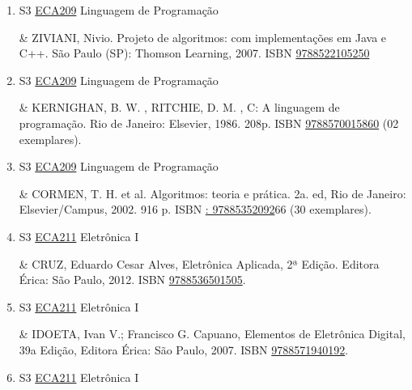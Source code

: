 \documentclass[12pt,a4paper]{book}
\begin{document}
\begin{enumerate}
& SOUZA, M.  A.  F. , GOMES, M.  M. , SOARES, M.  V. , CONCILIO, R. , Algoritmos e Lógica de Programação,Editora Cengage Learning, São Paulo, 2008.  (25 exemplares).
 \item S3 \hyperref[PUD:ECA209]{ECA209} Linguagem de Programação

& ZIVIANI, Nivio.  Projeto de algoritmos: com implementações em Java e C++.  São Paulo (SP): Thomson Learning, 2007.  ISBN \href{http://www.bn.br/site/pages/servicosProfissionais/agenciaISBN/isbnBusca/FbnBuscaISBNCatalogo.asp?pField=ISBN&pIntPagina=1&pISBN=22105250&nidbISBN=true&hidbISBN=true}{9788522105250}
 

 \item S3 \hyperref[PUD:ECA209]{ECA209} Linguagem de Programação

& KERNIGHAN, B.  W. , RITCHIE, D.  M. , C: A linguagem de programação.  Rio de Janeiro: Elsevier, 1986.  208p.  ISBN \href{http://www.bn.br/site/pages/servicosProfissionais/agenciaISBN/isbnBusca/FbnBuscaISBNCatalogo.asp?pField=ISBN&pIntPagina=1&pISBN=70015860&nidbISBN=true&hidbISBN=true}{9788570015860} (02 exemplares). 
 

 \item S3 \hyperref[PUD:ECA209]{ECA209} Linguagem de Programação

& CORMEN, T.  H.  et al.  Algoritmos: teoria e prática.  2a.  ed, Rio de Janeiro: Elsevier/Campus, 2002.  916 p.  ISBN \href{http://www.google.com/search?hl=pt-BR&tbo=p&tbm=bks&q=isbn:: 97885352092&num=10}{: 97885352092}66 (30 exemplares).
 \item S3 \hyperref[PUD:ECA211]{ECA211} Eletrônica I

& CRUZ, Eduardo Cesar Alves, Eletrônica Aplicada, 2ª Edição.  Editora Érica: São Paulo, 2012.  ISBN \href{http://www.bn.br/site/pages/servicosProfissionais/agenciaISBN/isbnBusca/FbnBuscaISBNCatalogo.asp?pField=ISBN&pIntPagina=1&pISBN=36501505&nidbISBN=true&hidbISBN=true}{9788536501505}. 
 

 \item S3 \hyperref[PUD:ECA211]{ECA211} Eletrônica I

& IDOETA, Ivan V.;  Francisco G.  Capuano, Elementos de Eletrônica Digital, 39a Edição, Editora Érica: São Paulo, 2007.  ISBN \href{http://www.bn.br/site/pages/servicosProfissionais/agenciaISBN/isbnBusca/FbnBuscaISBNCatalogo.asp?pField=ISBN&pIntPagina=1&pISBN=71940192&nidbISBN=true&hidbISBN=true}{9788571940192}. 
 

 \item S3 \hyperref[PUD:ECA211]{ECA211} Eletrônica I


\end{enumerate}
\end{document}
